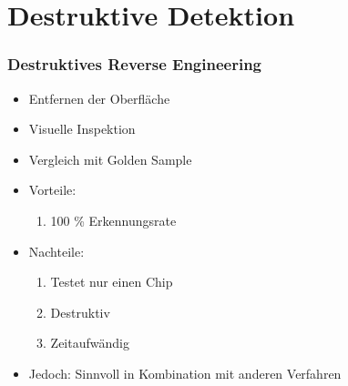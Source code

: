 \documentclass[11pt]{beamer}
\begin{document}
\section{Destruktive Detektion}
\begin{frame}
    \frametitle{Destruktives Reverse Engineering}
    \begin{itemize}
        \item Entfernen der Oberfläche
        \item Visuelle Inspektion
        \item Vergleich mit Golden Sample
        \item Vorteile: 
        \begin{enumerate}
            \item 100 \% Erkennungsrate
        \end{enumerate}
        \item Nachteile:
        \begin{enumerate}
            \item Testet nur einen Chip
            \item Destruktiv
            \item Zeitaufwändig
        \end{enumerate}
        \item Jedoch: Sinnvoll in Kombination mit anderen Verfahren
    \end{itemize}
\end{frame}
\end{document}
